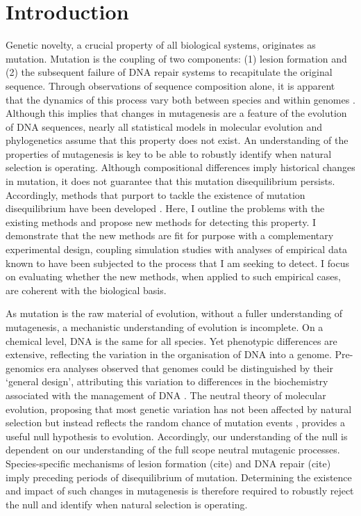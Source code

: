 \chapter{Introduction}
Genetic novelty, a crucial property of all biological systems, originates as mutation. Mutation is the coupling of two components: (1) lesion formation and (2) the subsequent failure of DNA repair systems to recapitulate the original sequence. Through observations of sequence composition alone, it is apparent that the dynamics of this process vary both between species \citep{Karlin1994ComparisonsSequences} and within genomes \citep{Francioli2015Genome-wideHumans}. Although this implies that changes in mutagenesis are a feature of the evolution of DNA sequences, nearly all statistical models in molecular evolution and phylogenetics assume that this property does not exist. An understanding of the properties of mutagenesis is key to be able to robustly identify when natural selection is operating. Although compositional differences imply historical changes in mutation, it does not guarantee that this mutation disequilibrium persists. Accordingly, methods that purport to tackle the existence of mutation disequilibrium have been developed \citep{Squartini2008QuantifyingProcess, Singh2009StrongDrosophila, Ababneh2006Matched-pairsSequences}. Here, I outline the problems with the existing methods and propose new methods for detecting this property. I demonstrate that the new methods are fit for purpose with a complementary experimental design, coupling simulation studies with analyses of empirical data known to have been subjected to the process that I am seeking to detect. I focus on evaluating whether the new methods, when applied to such empirical cases, are coherent with the biological basis.

As mutation is the raw material of evolution, without a fuller understanding of mutagenesis, a mechanistic understanding of evolution is incomplete. On a chemical level, DNA is the same for all species. Yet phenotypic differences are extensive, reflecting the variation in the organisation of DNA into a genome. Pre-genomics era analyses observed that genomes could be distinguished by their `general design', attributing this variation to differences in the biochemistry associated with the management of DNA \citep{Karlin1994ComparisonsSequences, Karlin1995DinucleotideSignature}. The neutral theory of molecular evolution, proposing that most genetic variation has not been affected by natural selection but instead reflects the random chance of mutation events \citep{Kimura1968EvolutionaryLevel, King1969Non-DarwinianEvolution}, provides a useful null hypothesis to evolution. Accordingly, our understanding of the null is dependent on our understanding of the full scope neutral mutagenic processes. Species-specific mechanisms of lesion formation (cite) and DNA repair (cite) imply preceding periods of disequilibrium of mutation. Determining the existence and impact of such changes in mutagenesis is therefore required to robustly reject the null and identify when natural selection is operating.

